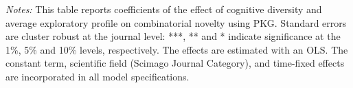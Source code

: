 \begin{table}[h!]
{\begin{threeparttable}
\begin{tabular}{@{\extracolsep{8pt}}lD{.}{.}{-3} D{.}{.}{-3} D{.}{.}{-3} D{.}{.}{-3} D{.}{.}{-3} }
\end{tabular} 
\begin{tablenotes}
 \footnotesize
 \justifying \item {\it Notes:}
 This table reports coefficients of the effect of cognitive diversity and average exploratory profile on combinatorial novelty using PKG. Standard errors are cluster robust at the journal level: ***, ** and * indicate significance at the 1\%, 5\% and 10\% levels, respectively. The effects are estimated with an OLS. The constant term, scientific field (Scimago Journal Category), and time-fixed effects are incorporated in all model specifications.
 \end{tablenotes}
 \end{threeparttable}
 }
\end{table} 